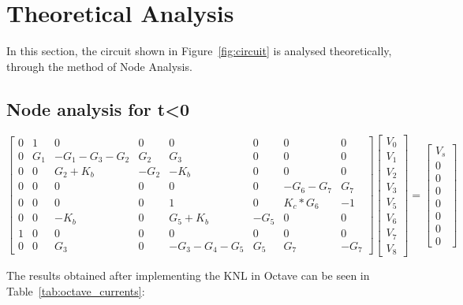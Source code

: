 \section{Theoretical Analysis}
\label{sec:analysis}

\tab In this section, the circuit shown in Figure~\ref{fig:circuit} is analysed
theoretically, through the method of Node Analysis.

\subsection{Node analysis for t<0}
\label{subsec:node}
\tab 
\begin{equation}
\begin{bmatrix}
  0 & 1 & 0 & 0 & 0 & 0 & 0 & 0 \\
  0 & G_1 & -G_1-G_3-G_2 & G_2 & G_3 & 0 & 0 & 0 \\
  0 & 0 & G_2+K_b & -G_2 & -K_b & 0 & 0 & 0 \\
  0 & 0 & 0 & 0 & 0 & 0 & -G_6-G_7 & G_7 \\
  0 & 0 & 0 & 0 & 1 & 0 & K_c*G_6 & -1 \\
  0 & 0 & -K_b & 0 & G_5+K_b & -G_5 & 0 & 0 \\
  1 & 0 & 0 & 0 & 0 & 0 & 0 & 0 \\
  0 & 0 & G_3 & 0 & -G_3-G_4-G_5 & G_5 & G_7 & -G_7
\end{bmatrix}
\begin{bmatrix}
  V_0 \\ V_1 \\ V_2 \\ V_3 \\ V_5 \\ V_6 \\ V_7 \\ V_8
\end{bmatrix}
=
\begin{bmatrix}
  V_s \\ 0 \\ 0 \\ 0 \\ 0 \\ 0 \\ 0 \\ 0
\end{bmatrix}
\end{equation}

The results obtained after implementing the KNL in Octave can be seen in Table~\ref{tab:octave_currents}:

